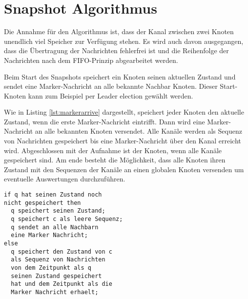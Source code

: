 \section{Snapshot Algorithmus}
\label{sec:snapshotalg}
Die Annahme für den Algorithmus ist, dass der Kanal zwischen zwei Knoten unendlich
viel Speicher zur Verfügung stehen. Es wird auch davon ausgegangen, dass die
Übertragung der Nachrichten fehlerfrei ist und die Reihenfolge der Nachrichten
nach dem FIFO-Prinzip abgearbeitet werden.

Beim Start des Snapshots speichert ein Knoten seinen aktuellen Zustand und sendet 
eine Marker-Nachricht an alle bekannte Nachbar Knoten. Dieser Start-Knoten kann
zum Beispiel per Leader election gewählt werden.

Wie in Listing \ref{lst:markerarrive} dargestellt, speichert jeder Knoten den
aktuelle Zustand, wenn die erste Marker-Nachricht eintrifft. Dann wird eine
Marker-Nachricht an alle bekannten Knoten versendet.  Alle Kanäle werden als
Sequenz von Nachrichten gespeichert bis eine Marker-Nachricht über den Kanal
erreicht wird. Abgeschlossen mit der Aufnahme ist der Knoten, wenn alle Kanäle
gespeichert sind.  
Am ende besteht die Möglichkeit, dass alle Knoten ihren Zustand mit
den Sequenzen der Kanäle an einen globalen Knoten versenden um eventuelle
Auswertungen durchzuführen.

\begin{lstlisting}[caption={Pseudo Ablauf, wenn Marker Nachricht über den Kanal c den Knoten q erreicht. \cite{snapshotChandyLamport}}, label=lst:markerarrive]
if q hat seinen Zustand noch
nicht gespeichert then
  q speichert seinen Zustand;
  q speichert c als leere Sequenz;
  q sendet an alle Nachbarn
  eine Marker Nachricht;
else
  q speichert den Zustand von c
  als Sequenz von Nachrichten
  von dem Zeitpunkt als q
  seinen Zustand gespeichert
  hat und dem Zeitpunkt als die
  Marker Nachricht erhaelt;
\end{lstlisting}
